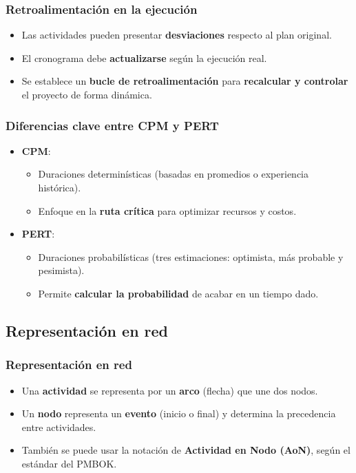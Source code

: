 \documentclass{beamer}
\begin{document}
\begin{frame}
\frametitle{Retroalimentación en la ejecución}

\begin{itemize}
    \item Las actividades pueden presentar \textbf{desviaciones} respecto al plan original.
    \item El cronograma debe \textbf{actualizarse} según la ejecución real.
    \item Se establece un \textbf{bucle de retroalimentación} para \textbf{recalcular y controlar} el proyecto de forma dinámica.
\end{itemize}

\end{frame}

\begin{frame}
\frametitle{Diferencias clave entre CPM y PERT}

\begin{itemize}
    \item \textbf{CPM}:
    \begin{itemize}
        \item Duraciones determinísticas (basadas en promedios o experiencia histórica).
        \item Enfoque en la \textbf{ruta crítica} para optimizar recursos y costos.
    \end{itemize}
    \item \textbf{PERT}:
    \begin{itemize}
        \item Duraciones probabilísticas (tres estimaciones: optimista, más probable y pesimista).
        \item Permite \textbf{calcular la probabilidad} de acabar en un tiempo dado.
    \end{itemize}
\end{itemize}

\end{frame}

\subsection{Representación en red}
\begin{frame}
\frametitle{Representación en red}

\begin{itemize}
    \item Una \textbf{actividad} se representa por un \textbf{arco} (flecha) que une dos nodos.
    \item Un \textbf{nodo} representa un \textbf{evento} (inicio o final) y determina la precedencia entre actividades.
    \item También se puede usar la notación de \textbf{Actividad en Nodo (AoN)}, según el estándar del PMBOK.
\end{itemize}

\end{frame}
\end{document}
